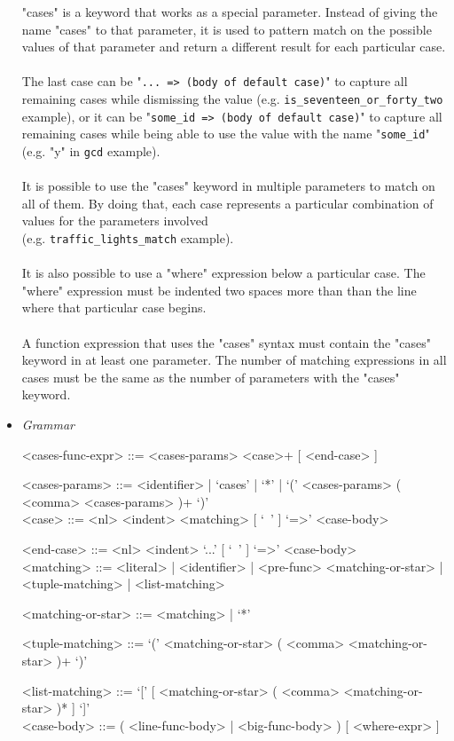 \documentclass{article}
\begin{document}
\begin{itemize}
"cases" is a keyword that works as a special parameter.  Instead of giving the
name "cases" to that parameter, it is used to pattern match on the possible
values of that parameter and return a different result for each particular
case. 
\\\\
The last case can be "\texttt{... => (body of default case)}" to capture all
remaining cases while dismissing the value (e.g.
\texttt{is_seventeen_or_forty_two} example), or it can be
"\texttt{some_id => (body of default case)}" to capture all remaining
cases while being able to use the value with the name "\texttt{some_id}"
(e.g.  "y" in \texttt{gcd} example).
\\\\
It is possible to use the "cases" keyword in multiple parameters to match on all
of them. By doing that, each case represents a particular combination of values
for the parameters involved\\(e.g. \texttt{traffic_lights_match} example).
\\\\
It is also possible to use a "where" expression below a particular case. The
"where" expression must be indented two spaces more than than the line where
that particular case begins.
\\\\
A function expression that uses the "cases" syntax must contain the "cases"
keyword in at least one parameter. The number of matching expressions in 
all cases must be the same as the number of parameters with the "cases" keyword.

\item \textit{Grammar}
\begin{grammar}
<cases-func-expr> ::= <cases-params> <case>+ [ <end-case> ]

<cases-params> ::=
<identifier> | `cases' | `*' | `(' <cases-params> ( <comma> <cases-params> )+ `)'
\\

<case> ::=  <nl> <indent> <matching> [ `\ ' ] `=>' <case-body>

<end-case> ::= <nl> <indent> `...' [ `\ ' ] `=>' <case-body>
\\

<matching> ::= 
<literal> | <identifier> | <pre-func> <matching-or-star> | <tuple-matching> |
<list-matching>

<matching-or-star> ::= <matching> | `*'

<tuple-matching> ::= `(' <matching-or-star> ( <comma> <matching-or-star> )+ `)'

<list-matching> ::= `[' [ <matching-or-star> ( <comma> <matching-or-star> )* ] `]'
\\

<case-body> ::= ( <line-func-body> | <big-func-body> ) [ <where-expr> ]
\end{grammar}

\end{itemize}
\end{document}
